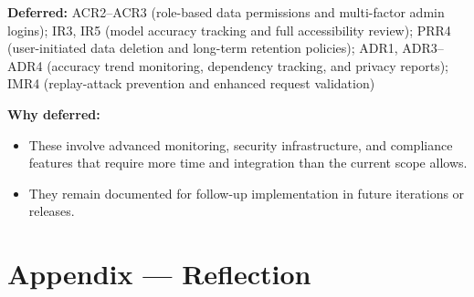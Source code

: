 \documentclass{article}
\begin{document}
\noindent \textbf{Deferred:} ACR2--ACR3 (role-based data permissions and multi-factor admin logins); IR3, IR5 (model accuracy tracking and full accessibility review); PRR4 (user-initiated data deletion and long-term retention policies); ADR1, ADR3--ADR4 (accuracy trend monitoring, dependency tracking, and privacy reports); IMR4 (replay-attack prevention and enhanced request validation)

\vspace{2mm}
\noindent \textbf{Why deferred:}
\begin{itemize}
  \item These involve advanced monitoring, security infrastructure, and compliance features that require more time and integration than the current scope allows.
  \item They remain documented for follow-up implementation in future iterations or releases.
\end{itemize}

\newpage{}

\section*{Appendix --- Reflection}


\end{document}
